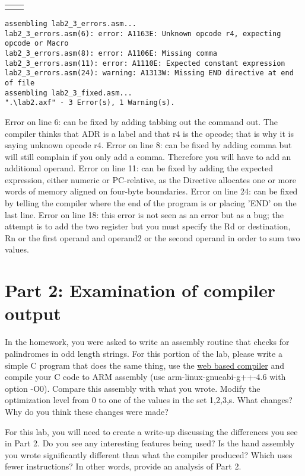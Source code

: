 \documentclass[letterpaper,12pt,titlepage]{article}
\begin{document}
\vspace{-0.75cm}
\begin{tabular}{p{7.5cm} p{7.5cm}}

&

\end{tabular}
\vspace{-0.75cm}
\begin{verbatim}
assembling lab2_3_errors.asm...
lab2_3_errors.asm(6): error: A1163E: Unknown opcode r4, expecting opcode or Macro
lab2_3_errors.asm(8): error: A1106E: Missing comma
lab2_3_errors.asm(11): error: A1110E: Expected constant expression
lab2_3_errors.asm(24): warning: A1313W: Missing END directive at end of file
assembling lab2_3_fixed.asm...
".\lab2.axf" - 3 Error(s), 1 Warning(s).
\end{verbatim}
Error on line 6: can be fixed by adding tabbing out the command out. The compiler thinks that ADR is a label and that r4 is the opcode; that is why it is saying unknown opcode r4.
Error on line 8: can be fixed by adding comma but will still complain if you only add a comma. Therefore you will have to add an additional operand.
Error on line 11: can be fixed by adding the expected expression, either numeric or PC-relative, as the Directive allocates one or more words of memory aligned on four-byte boundaries.
Error on line 24: can be fixed by telling the compiler where the end of the program is or placing 'END' on the last line. 
Error on line 18: this error is not seen as an error but as a bug; the attempt is to add the two register but you must specify the Rd or destination, Rn or the first operand and operand2 or the second operand in order to sum two values. 
\newpage
\section*{Part 2: Examination of compiler output}
In the homework, you were asked to write an assembly routine that checks for palindromes in odd length strings. For this portion of the lab, please write a simple C program that does the same thing, use the \href{http://gcc.godbolt.org}{web based compiler} and compile your  C code to ARM assembly (use arm-linux-gnueabi-g++-4.6 with option -O0). Compare this assembly with what you wrote. Modify the optimization level from 0 to one of the values in the set {1,2,3,s}. What changes? Why do you think these changes were made?

For this lab, you will need to create a write-up discussing the differences you see in Part 2. Do you see any interesting features being used? Is the hand assembly you wrote significantly different than what the compiler produced? Which uses fewer instructions? In other words, provide an analysis of Part 2.

%
\end{document}
